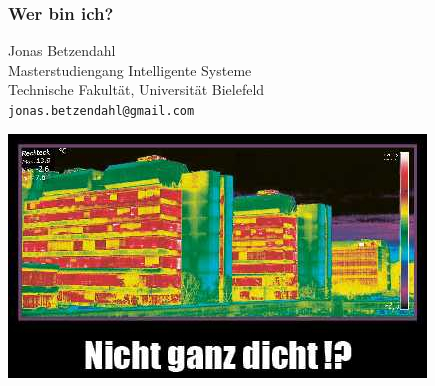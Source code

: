 \documentclass[aspectratio=43,x11names]{beamer}
\begin{document}

\begin{frame}
\frametitle{Wer bin ich?}

Jonas Betzendahl\\
Masterstudiengang \glqq Intelligente Systeme\grqq\\
Technische Fakultät, Universität Bielefeld\\
\texttt{jonas.betzendahl@gmail.com}
\smallskip\smallskip

\begin{center}
\includegraphics[scale=0.5]{images/thermopostkarte.jpg} 
\end{center}
\end{frame}

\end{document}
